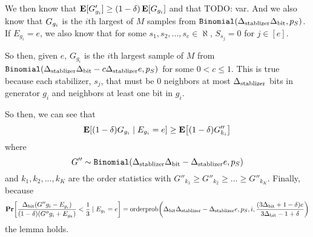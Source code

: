 We then know that $\operatorname*{\mathbf{E}}[G'_{g_i}] \geq (1 - \delta)\operatorname*{\mathbf{E}}[G_{g_i}]$
and that TODO: var.
And we also know that $G_{g_i}$ is the $i$th largest of $M$ samples from
$\texttt{Binomial}({\Delta_{\text{stablizer}}} {\Delta_{\text{bit}}}, p_S)$. 
If $E_{g_i} = e$, we also know that for some $s_1, s_2, ..., s_e \in \aleph$, $S_{s_j} = 0$ for $j \in [e]$.

So then, given $e$, $G_{g_i}$ is the $i$th largest sample of $M$ from $\texttt{Binomial}({\Delta_{\text{stablizer}}} {\Delta_{\text{bit}}} - c{\Delta_{\text{stablizer}}} e, p_S)$
for some $0 < c \leq 1$.
This is true because each stabilizer, $s_j$, that must be 0 neighbors at most ${\Delta_{\text{stablizer}}}$ bits
in generator $g_i$ and neighbors at least one bit in $g_i$.

So then, we can see that
$$
	\E\mleft[(1 - \delta) G_{g_i} \mid \lyingGenerator_{g_i} = e\mright] \geq \E\mleft[(1 - \delta) G''_{k_i}\mright]
$$
where 
$$
	G'' \sim \texttt{Binomial}({\Delta_{\text{stablizer}}} {\Delta_{\text{bit}}} - {\Delta_{\text{stablizer}}} e, p_S)
$$
and $k_1, k_2, ..., k_K$ are the order statistics with $G''_{k_1} \geq G''_{k_2} \geq ... \geq G''_{k_K}$.
Finally, because 
$$
\Pr\mleft[\OptVarEqChangeable{G''} < \frac{1}{3} \mid E_{g_i} = e\mright] = 
	\OrderP\mleft(\orderpinner\mright)
$$
the lemma holds.

